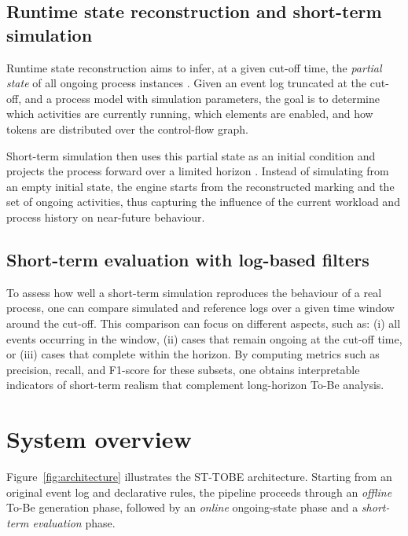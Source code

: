 \documentclass[a4paper,fleqn]{cas-sc}
\begin{document}
\subsection{Runtime state reconstruction and short-term simulation}

Runtime state reconstruction aims to infer, at a given cut-off
time, the \emph{partial state} of all ongoing process instances
\citep{ChapelaCampa2025TSC}.
Given an event log truncated at the cut-off, and a process model
with simulation parameters, the goal is to determine which
activities are currently running, which elements are enabled,
and how tokens are distributed over the control-flow graph.

Short-term simulation then uses this partial state as an initial
condition and projects the process forward over a limited
horizon \citep{Avramenko2025arXiv}.
Instead of simulating from an empty initial state, the engine
starts from the reconstructed marking and the set of ongoing
activities, thus capturing the influence of the current workload
and process history on near-future behaviour.

\subsection{Short-term evaluation with log-based filters}

To assess how well a short-term simulation reproduces the
behaviour of a real process, one can compare simulated and
reference logs over a given time window around the cut-off.
This comparison can focus on different aspects, such as:
(i) all events occurring in the window,
(ii) cases that remain ongoing at the cut-off time, or
(iii) cases that complete within the horizon.
By computing metrics such as precision, recall, and F1-score
for these subsets, one obtains interpretable indicators of
short-term realism that complement long-horizon To-Be analysis.

\section{System overview}
\label{sec:overview}

Figure~\ref{fig:architecture} illustrates the
ST-TOBE architecture.
Starting from an original event log and declarative rules, the
pipeline proceeds through an \emph{offline} To-Be
generation phase, followed by an \emph{online} ongoing-state
phase and a \emph{short-term evaluation} phase.
\end{document}
